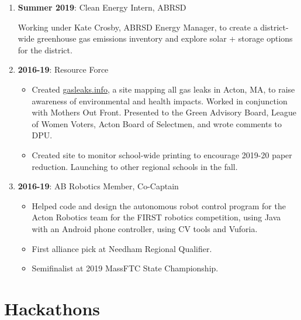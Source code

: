 \documentclass[paper=letter]{tccv}
\begin{document}
\begin{enumerate}
    \item \textbf{Summer 2019}: Clean Energy Intern, ABRSD
    
        Working under Kate Crosby, ABRSD Energy Manager, to create a district-wide greenhouse gas emissions inventory and explore solar + storage options for the district.
    \item \textbf{2016-19}: Resource Force
        \begin{itemize}
           \item Created \href{https://gasleaks.info}{gasleaks.info}, a site mapping all gas leaks in Acton, MA, to raise awareness of environmental and health impacts. Worked in conjunction with Mothers Out Front. Presented to the Green Advisory Board, League of Women Voters, Acton Board of Selectmen, and wrote comments to DPU.
           \item Created site to monitor school-wide printing to encourage 2019-20 paper reduction. Launching to other regional schools in the fall.
        \end{itemize}
 
    \item \textbf{2016-19}: AB Robotics Member, Co-Captain
        \begin{itemize}
           \item Helped code and design the autonomous robot control program for the Acton Robotics team for the FIRST robotics competition, using Java with an Android phone controller, using CV tools and Vuforia.
           \item First alliance pick at Needham Regional Qualifier.
           \item Semifinalist at 2019 MassFTC State Championship.
        \end{itemize}
    
\end{enumerate}

\newpage

\section{Hackathons}
\end{document}
